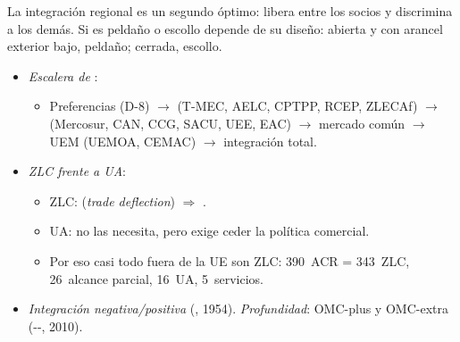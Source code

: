 \documentclass{article}
\begin{document}
\begin{columnas}
\begin{ideaclave}
La integración regional es un segundo óptimo: libera entre los socios y discrimina a los demás. Si es peldaño o escollo depende de su diseño: abierta y con arancel exterior bajo, peldaño; cerrada, escollo.
\end{ideaclave}

\begin{itemize}
\item \emph{Escalera de }:
  \begin{itemize}
  \item Preferencias (D-8) $\to$  (T-MEC, AELC, CPTPP, RCEP, ZLECAf) $\to$  (Mercosur, CAN, CCG, SACU, UEE, EAC) $\to$ mercado común $\to$ UEM (UEMOA, CEMAC) $\to$ integración total.
  \end{itemize}
\item \emph{ZLC frente a UA}:
  \begin{itemize}
  \item ZLC:  (\emph{trade deflection}) $\Rightarrow$ .
  \item UA: no las necesita, pero exige ceder la política comercial.
  \item Por eso casi todo fuera de la UE son ZLC: 390~ACR = 343~ZLC, 26~alcance parcial, 16~UA, 5~servicios.
  \end{itemize}
\item \emph{Integración negativa/positiva} (, 1954). \emph{Profundidad}: OMC-plus y OMC-extra (--, 2010).
\end{itemize}


\end{columnas}
\end{document}
